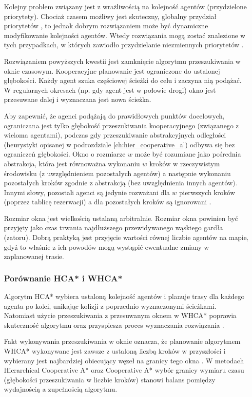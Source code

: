 Kolejny problem związany jest z wrażliwością na kolejność agentów (przydzielone priorytety). Chociaż czasem możliwy jest skuteczny, globalny przydział priorytetów \cite{latombe}, to jednak dobrym rozwiązaniem może być dynamiczne modyfikowanie kolejności agentów. Wtedy rozwiązania mogą zostać znalezione w tych przypadkach, w których zawiodło przydzielanie niezmiennych priorytetów \cite{cooppath}.

Rozwiązaniem powyższych kwestii jest zamknięcie algorytmu przeszukiwania w oknie czasowym.
Kooperacyjne planowanie jest ograniczone do ustalonej głębokości. Każdy agent szuka częściowej ścieżki do celu i zaczyna nią podążać. W regularnych okresach (np. gdy agent jest w połowie drogi) okno jest przesuwane dalej i wyznaczana jest nowa ścieżka.

Aby zapewnić, że agenci podążają do prawidłowych punktów docelowych, ograniczana jest tylko głębokość przeszukiwania kooperacyjnego (związanego z wieloma agentami), podczas gdy przeszukiwanie abstrakcyjnych odległości (heurystyki opisanej w podrozdziale \ref{ch:hier_cooperative_a}) odbywa się bez ograniczeń głębokości. Okno o rozmiarze $w$ może być rozumiane jako pośrednia abstrakcja, która jest równoważna wykonaniu $w$ kroków w rzeczywistym środowisku (z uwzględnieniem pozostałych agentów) a następnie wykonaniu pozostałych kroków zgodnie z abstrakcją (bez uwzględnienia innych agentów). Innymi słowy, pozostali agenci są jedynie rozważani dla $w$ pierwszych kroków (poprzez tablicę rezerwacji) a dla pozostałych kroków są ignorowani \cite{cooppath}.

Rozmiar okna jest wielkością ustalaną arbitralnie. Rozmiar okna powinien być przyjęty jako czas trwania najdłuższego przewidywanego wąskiego gardła (zatoru).
Dobrą praktyką jest przyjęcie wartości równej liczbie agentów na mapie, gdyż to właśnie z ich powodów mogą wystąpić ewentualne zmiany w zaplanowanej trasie.

\subsubsection{Porównanie HCA* i WHCA*}
Algorytm HCA* wybiera ustaloną kolejność agentów i planuje trasy dla każdego agenta po kolei, unikając kolizji z poprzednio wyznaczonymi ścieżkami. 
Natomiast użycie przeszukiwania z przesuwanym oknem w WHCA* poprawia skuteczność algorytmu oraz przyspiesza proces wyznaczania rozwiązania \cite{completealgo_standley}.

Fakt wykonywania przeszukiwania w oknie oznacza, że planowanie algorytmem WHCA* wykonywane jest zawsze z ustaloną liczbą kroków w przyszłości i wybierany jest najbardziej obiecujący węzeł na granicy tego okna \cite{rtcooppathfinding}. W metodach Hierarchical Cooperative A* oraz Cooperative A* wybór granicy wymiaru czasu (głębokości przeszukiwania w liczbie kroków) stanowi balans pomiędzy wydajnością a zupełnością algorytmu.


